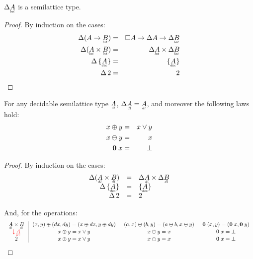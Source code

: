 \documentclass{article}
\begin{document}

\begin{lemma}
  $\Ch \lat{A}$ is a semilattice type.

\end{lemma}
\begin{proof}
  By induction on the cases:
  \begin{eqnarray*}
    \Ch(A \to \lat{B}) &=& \Disc{A} \to \Ch A \to \Ch \lat{B}\\
    \Ch(\lat{A} \x \lat{B}) &=& \Ch \lat{A} \x \Ch \lat{B}\\
    \Ch\thinspace \Seteq{A} &=& \Seteq{A}\\
    \Ch\thinspace 2 &=& 2
  \end{eqnarray*}
\end{proof}

\begin{lemma}\label{lemma:dl-boring}
  For any decidable semilattice type $\eqlat{A}$, $\Ch \eqlat{A} = \eqlat{A}$,
  and moreover the following laws hold:
  \begin{eqnarray*}
    x \oplus y &=& x \vee y\\
    x \ominus y &=& x\\
    \mathbf{0}\; x &=& \bot
  \end{eqnarray*}
\end{lemma}
\begin{proof}
  By induction on the cases:
  \[\begin{array}{rcl}
    \Ch(\eqlat{A} \x \eqlat{B}) &=& \Ch \eqlat{A} \x \Ch \eqlat{B}\\
    \Ch\thinspace \Seteq{A} &=& \Seteq{A}\\
    \Ch\thinspace \tbool &=& \tbool
  \end{array}\]

  And, for the operations:
  \[\arraycolsep=0.75em
  \begin{array}{c|ccc}
    \eqlat{A} \x \eqlat{B}
    & (x,y) \oplus (dx,dy) = (x \oplus dx, y \oplus dy)
    & (a,x) \ominus (b,y) = (a \ominus b, x \ominus y)
    & \zero\; (x,y) = (\zero\; x, \zero\; y)\\
    \Down{\eq{A}}
    & x \oplus y = x \vee y
    & x \ominus y = x
    & \zero\;x = \unit\\
    \tbool
    & x \oplus y = x \vee y
    & x \ominus y = x
    & \zero\;x = \unit\\
  \end{array}
  \]
\end{proof}
\end{document}
